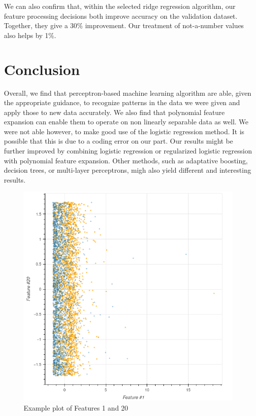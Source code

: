 \documentclass[10pt,conference,compsocconf]{IEEEtran}
\begin{document}
We can also confirm that, within the selected ridge regression algorithm, our feature processing decisions both improve accuracy on the validation dataset. Together, they give a 30\% improvement. Our treatment of not-a-number values also helps by 1\%.

\section{Conclusion}
Overall, we find that perceptron-based machine learning algorithm are able, given the appropriate guidance, to recognize patterns in the data we were given and apply those to new data accurately. We also find that polynomial feature expansion can enable them to operate on non linearly separable data as well. We were not able however, to make good use of the logistic regression method. It is possible that this is due to a coding error on our part. Our results might be further improved by combining logistic regression or regularized logistic regression with polynomial feature expansion. Other methods, such as adaptative boosting, decision trees, or multi-layer perceptrons, migh also yield different and interesting results.

\begin{figure}
	\includegraphics[width=\columnwidth]{f1-f20.png}
	\caption{Example plot of Features 1 and 20}
	\label{f1-f20}
\end{figure}
\end{document}
